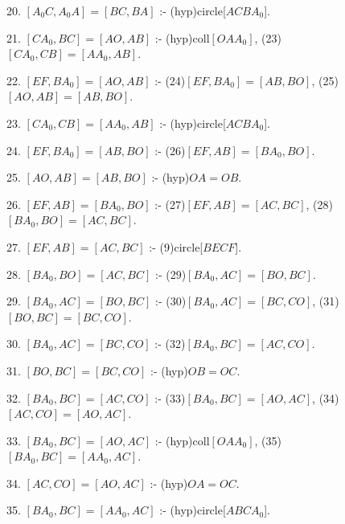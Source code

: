 {20. $[A_{0}C,A_{0}A]=[BC,BA]$ :- (hyp)circle[$ACBA_{0}$].

21. $[CA_{0},BC]=[AO,AB]$ :- (hyp)coll$[OAA_{0}]$, (23)$[CA_{0},CB]=[AA_{0},AB]$.

22. $[EF,BA_{0}]=[AO,AB]$ :- (24)$[EF,BA_{0}]=[AB,BO]$, (25)$[AO,AB]=[AB,BO]$.

23. $[CA_{0},CB]=[AA_{0},AB]$ :- (hyp)circle[$ACBA_{0}$].

24. $[EF,BA_{0}]=[AB,BO]$ :- (26)$[EF,AB]=[BA_{0},BO]$.

25. $[AO,AB]=[AB,BO]$ :- (hyp)$OA = OB$.

26. $[EF,AB]=[BA_{0},BO]$ :- (27)$[EF,AB]=[AC,BC]$, (28)$[BA_{0},BO]=[AC,BC]$.

27. $[EF,AB]=[AC,BC]$ :- (9)circle[$BECF$].

28. $[BA_{0},BO]=[AC,BC]$ :- (29)$[BA_{0},AC]=[BO,BC]$.

29. $[BA_{0},AC]=[BO,BC]$ :- (30)$[BA_{0},AC]=[BC,CO]$, (31)$[BO,BC]=[BC,CO]$.

30. $[BA_{0},AC]=[BC,CO]$ :- (32)$[BA_{0},BC]=[AC,CO]$.

31. $[BO,BC]=[BC,CO]$ :- (hyp)$OB = OC$.

32. $[BA_{0},BC]=[AC,CO]$ :- (33)$[BA_{0},BC]=[AO,AC]$, (34)$[AC,CO]=[AO,AC]$.

33. $[BA_{0},BC]=[AO,AC]$ :- (hyp)coll$[OAA_{0}]$, (35)$[BA_{0},BC]=[AA_{0},AC]$.

34. $[AC,CO]=[AO,AC]$ :- (hyp)$OA = OC$.

35. $[BA_{0},BC]=[AA_{0},AC]$ :- (hyp)circle[$ABCA_{0}$].
}

